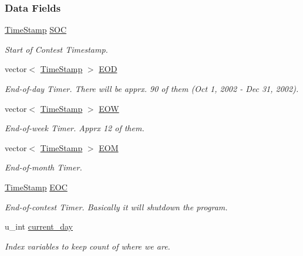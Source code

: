 \subsubsection*{Data Fields}
\begin{CompactItemize}
\item 
\hyperlink{classTimeStamp}{Time\-Stamp} \hyperlink{classContest_Contestm0}{SOC}
\begin{CompactList}\small\item\em Start of Contest Timestamp.\item\end{CompactList}\item 
vector$<$ \hyperlink{classTimeStamp}{Time\-Stamp} $>$ \hyperlink{classContest_Contestm1}{EOD}
\begin{CompactList}\small\item\em End-of-day Timer. There will be apprx. 90 of them (Oct 1, 2002 - Dec 31, 2002).\item\end{CompactList}\item 
vector$<$ \hyperlink{classTimeStamp}{Time\-Stamp} $>$ \hyperlink{classContest_Contestm2}{EOW}
\begin{CompactList}\small\item\em End-of-week Timer. Apprx 12 of them.\item\end{CompactList}\item 
vector$<$ \hyperlink{classTimeStamp}{Time\-Stamp} $>$ \hyperlink{classContest_Contestm3}{EOM}
\begin{CompactList}\small\item\em End-of-month Timer.\item\end{CompactList}\item 
\hyperlink{classTimeStamp}{Time\-Stamp} \hyperlink{classContest_Contestm4}{EOC}
\begin{CompactList}\small\item\em End-of-contest Timer. Basically it will shutdown the program.\item\end{CompactList}\item 
u\_\-int \hyperlink{classContest_Contestm5}{current\_\-day}
\begin{CompactList}\small\item\em Index variables to keep count of where we are.\item\end{CompactList}\item 

\end{CompactItemize}
